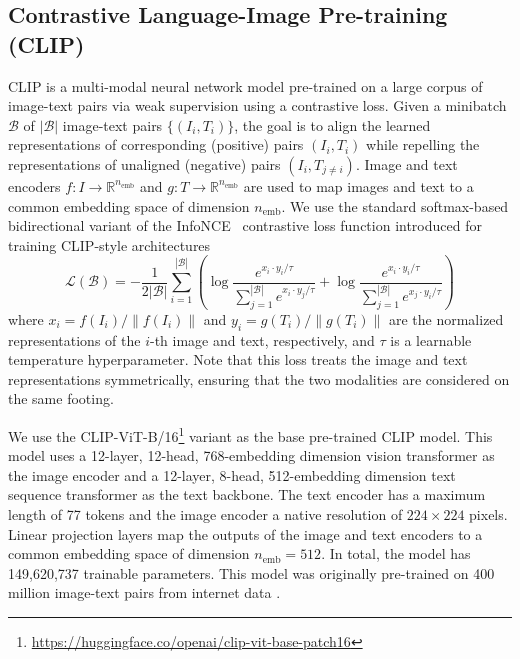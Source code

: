 \documentclass[10pt]{article} %
\begin{document}
\subsection{Contrastive Language-Image Pre-training (CLIP)}

CLIP \citep[Contrastive Language-Image Pre-training;][]{radford2021learning} is a multi-modal neural network model pre-trained on a large corpus of image-text pairs via weak supervision using a contrastive loss.
%
Given a minibatch $\mathcal{B}$ of $|\mathcal{B}|$ image-text pairs $\{(I_i, T_i)\}$, the goal is to align the learned representations of corresponding (positive) pairs $(I_i, T_i)$ while repelling the representations of unaligned (negative) pairs $(I_i, T_{j\neq i})$.
%
Image and text encoders $f: I \rightarrow \mathbb R^{n_\text{emb}}$ and $g: T \rightarrow \mathbb R^{n_\text{emb}}$ are used to map images and text to a common embedding space of dimension $n_\text{emb}$.
%
We use the standard softmax-based bidirectional variant of the InfoNCE~\citep{oord2018representation} contrastive loss function introduced for training CLIP-style architectures \citep{radford2021learning}
%
\begin{equation}
  \label{eq:softmax_loss}
  \mathcal{L}(\mathcal{B})=-\frac{1}{2|\mathcal{B}|} \sum_{i=1}^{|\mathcal{B}|}\left(\log \frac{e^{x_i \cdot y_i / \tau}}{\sum_{j=1}^{|\mathcal{B}|} e^{x_i \cdot y_j / \tau}}+\log \frac{e^{x_i \cdot y_i / \tau}}{\sum_{j=1}^{|\mathcal{B}|} e^{x_j \cdot y_i / \tau}}\right)
\end{equation}
%
where ${x}_i={f\left(I_i\right)}/{\left\|f\left(I_i\right)\right\|}$ and ${y}_i={g\left(T_i\right)}/{\left\|g\left(T_i\right)\right\|}$ are the normalized representations of the $i$-th image and text, respectively, and $\tau$ is a learnable temperature hyperparameter.
%
Note that this loss treats the image and text representations symmetrically, ensuring that the two modalities are considered on the same footing.

We use the CLIP-ViT-B/16\footnote{\url{https://huggingface.co/openai/clip-vit-base-patch16}} \citep{radford2021learning} variant as the base pre-trained CLIP model.
%
This model uses a 12-layer, 12-head, 768-embedding dimension vision transformer as the image encoder and a 12-layer, 8-head, 512-embedding dimension text sequence transformer as the text backbone.
%
The text encoder has a maximum length of 77 tokens and the image encoder a native resolution of $224\times224$ pixels.
%
Linear projection layers map the outputs of the image and text encoders to a common embedding space of dimension $n_\text{emb}=512$.
%
In total, the model has 149,620,737 trainable parameters.
%
This model was originally pre-trained on 400 million image-text pairs from internet data \citep{radford2021learning}.
%
\end{document}

